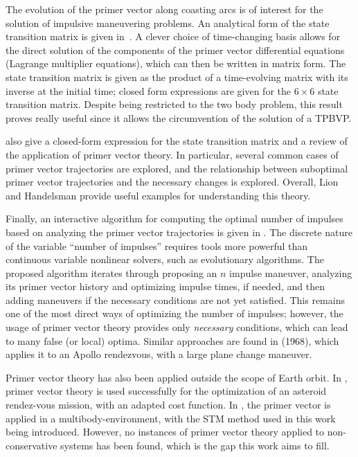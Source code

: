 The evolution of the primer vector along coasting arcs is of interest for the solution of impulsive maneuvering problems. An analytical form of the state transition matrix is given in~. A clever choice of time-changing basis allows for the direct solution of the components of the primer vector differential equations (Lagrange multiplier equations), which can then be written in matrix form. The state transition matrix is given as the product of a time-evolving matrix with its inverse at the initial time; closed form expressions are given for the \(6\times6\) state transition matrix. Despite being restricted to the two body problem, this result proves really useful since it allows the circumvention of the solution of a TPBVP.

 also give a closed-form expression for the state transition matrix and a review of the application of primer vector theory. In particular, several common cases of primer vector trajectories are explored, and the relationship between suboptimal primer vector trajectories and the necessary changes is explored. Overall, Lion and Handelsman provide useful examples for understanding this theory. 

Finally, an interactive algorithm for computing the optimal number of impulses based on analyzing the primer vector trajectories is given in . The discrete nature of the variable ``number of impulses'' requires tools more powerful than continuous variable nonlinear solvers, such as evolutionary algorithms. The proposed algorithm iterates through proposing an \(n\) impulse maneuver, analyzing its primer vector history and optimizing impulse times, if needed, and then adding maneuvers if the necessary conditions are not yet satisfied. This remains one of the most direct ways of optimizing the number of impulses; however, the usage of primer vector theory provides only \textit{necessary} conditions, which can lead to many false (or local) optima. Similar approaches are found in  (1968), which applies it to an Apollo rendezvous, with a large plane change maneuver.

Primer vector theory has also been applied outside the scope of Earth orbit. In , primer vector theory is used successfully for the optimization of an asteroid rendez-vous mission, with an adapted cost function. In , the primer vector is applied in a multibody-environment, with the STM method used in this work being introduced. However, no instances of primer vector theory applied to non-conservative systems has been found, which is the gap this work aims to fill.